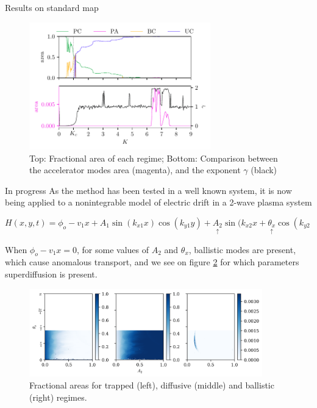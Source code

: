 \documentclass[final]{beamer}
\newlength{\colwidth}
\begin{document}
\begin{frame}[t]
\begin{columns}[t]
\begin{column}{\colwidth}
\begin{block}{Results on standard map}
  \begin{figure}
    \centering
    \includegraphics[width = 0.7\textwidth]{areas.pdf}
    \caption{Top: Fractional area of each regime; Bottom: Comparison between the accelerator modes area (magenta), and the exponent $\gamma$ (black)}
    \label{areas}
\end{figure}

  
  \end{block}

  \begin{block}{In progress}
    As the method has been tested in a well known system, it is now being applied to a nonintegrable model of electric drift in a 2-wave plasma system
    
    \begin{equation}
      H(x,y,t) = \phi_o - v_1x + A_1 \sin(k_{x1}x)\cos(k_{y1}y) + \underset{\uparrow}{A_2}\sin(k_{x2}x + \underset{\uparrow}{\theta_x}\cos(k_{y2}(y - vt)).
    \end{equation}

    When $\phi_o - v_1x = 0$, for some values of $A_2$ and $\theta_x$, ballistic modes are present, which cause anomalous transport, and we see on figure \ref{paramspace} for which parameters superdiffusion is present.
 
    \begin{figure}
      \includegraphics[width = 0.9\textwidth]{paramspace.png}
      \caption{Fractional areas for trapped (left), diffusive (middle) and ballistic (right) regimes.}
      \label{paramspace}
    \end{figure}
    

\end{block}
\end{column}
\end{columns}
\end{frame}
\end{document}
